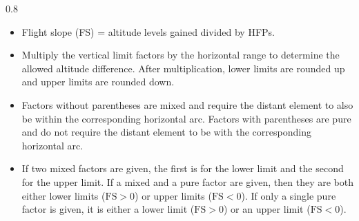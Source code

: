 \begin{twocolumntablefloat}
\begin{twocolumntable}
\smallskip

\begin{tablenote}{0.8\linewidth}\small
\begin{itemize}

\item
Flight slope (FS) = altitude levels gained divided by HFPs.

\item
Multiply the vertical limit factors by the horizontal range to determine the allowed altitude difference. After multiplication, lower limits are rounded up and upper limits are rounded down. 

\item
Factors without parentheses are mixed and require the distant element to also be within the corresponding horizontal arc. Factors with parentheses are pure and do not require the distant element to be with the corresponding horizontal arc. 

\item
If two mixed factors are given, the first is for the lower limit and the second for the upper limit. If a mixed and a pure factor are given, then they are both either lower limits ($\mbox{FS} > 0$) or upper limits ($\mbox{FS} < 0$). If only a single pure factor is given, it is either a lower limit ($\mbox{FS} > 0$) or an upper limit ($\mbox{FS} < 0$).
\end{itemize}
\end{tablenote}

\end{twocolumntable}
\end{twocolumntablefloat}
